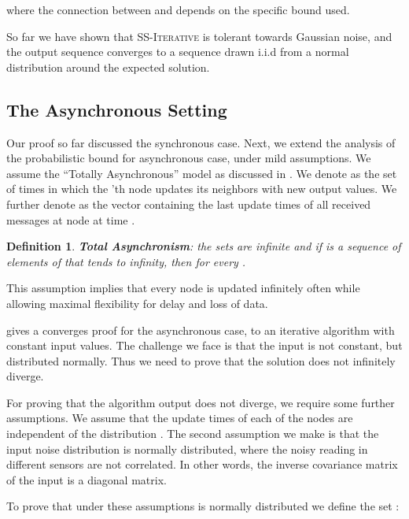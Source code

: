 \documentclass[preprint,12pt]{elsarticle}
\newtheorem{definition}{Definition}
\newcommand{\syncAlg}{\textsc{SS-Iterative}\xspace}
\begin{document}
where the connection between  and  depends on the specific bound used.

So far we have shown that \syncAlg is tolerant towards Gaussian noise, and the output sequence converges to a sequence drawn i.i.d from a normal distribution around the expected solution. 

\subsection{The Asynchronous Setting}

Our proof so far discussed the synchronous case. Next, we extend the analysis of the probabilistic bound for asynchronous case, under mild assumptions. We assume the ``Totally Asynchronous'' model as discussed in \cite{BT97}. We denote  as the set of times in which the 'th node updates its neighbors with new output values. We further denote  as the vector containing the last update times of all received messages at node  at time .
\begin{definition}
 {\bf Total Asynchronism}: the sets  are infinite and if  is a sequence of elements of  that tends to infinity, then  for every .
\end{definition}
This assumption implies that every node is updated infinitely often while allowing maximal flexibility for delay and loss of data.

\cite{BT97} gives a converges proof for the asynchronous case, to an iterative algorithm with constant input values.
The challenge we face is that the input is not constant, but distributed normally. Thus we need to prove that the solution does not infinitely diverge.

For proving that the algorithm output does not diverge, we require some further assumptions. We assume that the update times of each of the nodes are independent of the distribution . The second assumption we make is that the
input noise distribution is normally distributed, where the noisy reading in different sensors are not correlated.
In other words, the inverse covariance matrix of the input is a diagonal matrix.

To prove that under these assumptions  is normally distributed we define the set :
\end{document}
